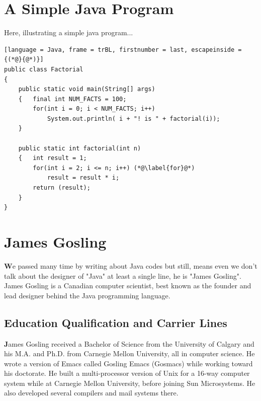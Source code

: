 \documentclass[paper = A5, headinclude, parskip = full, oneside, font = 11 pt]{report}
\begin{document}
\color{green}
\section{A Simple Java Program}
\color{black}
Here, illustrating a simple java program...

\color{purple}
\begin{lstlisting}[language = Java, frame = trBL, firstnumber = last, escapeinside = {(*@}{@*)}]
public class Factorial
{
    public static void main(String[] args)
    {   final int NUM_FACTS = 100;
        for(int i = 0; i < NUM_FACTS; i++)
            System.out.println( i + "! is " + factorial(i));
    }

    public static int factorial(int n)
    {   int result = 1;
        for(int i = 2; i <= n; i++) (*@\label{for}@*)
            result = result * i;
        return (result);
    }
}
\end{lstlisting}

\color{green}
\section{James Gosling}
\color{black}
\textbf{W}e passed many time by writing about Java codes but still, means even we don't talk about the designer of "Java" at least a single line, he is "James Gosling".
James Gosling is a Canadian computer scientist, best known as the founder and lead designer behind the Java programming language.

\color{red}
\subsection{Education Qualification and Carrier Lines}
\color{black}
\textbf{J}ames Gosling received a Bachelor of Science from the University of Calgary and his M.A. and Ph.D. from Carnegie Mellon University, all in computer science. He wrote a version of Emacs called Gosling Emacs (Gosmacs) while working toward his doctorate. He built a multi-processor version of Unix for a 16-way computer system while at Carnegie Mellon University, before joining Sun Microsystems. He also developed several compilers and mail systems there.
\end{document}

